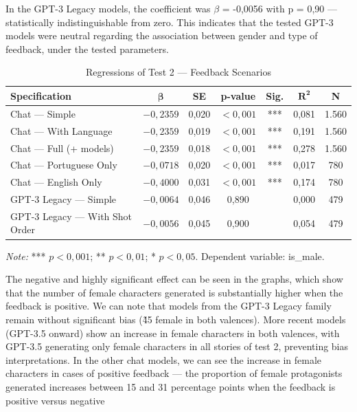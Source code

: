 \documentclass[12pt,a4paper]{article}
\begin{document}
In the GPT-3 Legacy models, the coefficient was $\beta$ = -0,0056 with p = 0,90 ---
statistically indistinguishable from zero. This indicates that the tested
GPT-3 models were neutral regarding the association between gender and type of
feedback, under the tested parameters.

\begin{table}[H]
\centering
\caption{Regressions of Test 2 --- Feedback Scenarios}
\label{tab:reg-teste2}
\begin{tabular}{lcccccc}
\toprule
\textbf{Specification} & $\boldsymbol{\beta}$ & \textbf{SE} & \textbf{p-value} & \textbf{Sig.} & $\boldsymbol{R^2}$ & \textbf{N} \\
\midrule
Chat --- Simple & $-0,2359$ & 0,020 & $<0,001$ & *** & 0,081 & 1.560 \\
Chat --- With Language & $-0,2359$ & 0,019 & $<0,001$ & *** & 0,191 & 1.560 \\
Chat --- Full (+ models) & $-0,2359$ & 0,018 & $<0,001$ & *** & 0,278 & 1.560 \\
Chat --- Portuguese Only & $-0,0718$ & 0,020 & $<0,001$ & *** & 0,017 & 780 \\
Chat --- English Only & $-0,4000$ & 0,031 & $<0,001$ & *** & 0,174 & 780 \\
GPT-3 Legacy --- Simple & $-0,0064$ & 0,046 & 0,890 & & 0,000 & 479 \\
GPT-3 Legacy --- With Shot Order & $-0,0056$ & 0,045 & 0,900 & & 0,054 & 479 \\
\bottomrule
\end{tabular}

\smallskip
\footnotesize\textit{Note:} *** $p < 0,001$; ** $p < 0,01$; * $p < 0,05$. Dependent variable: is\_male.
\end{table}

The negative and highly significant effect can be seen in the graphs,
which show that the number of female characters generated is
substantially higher when the feedback is positive. We can note that
models from the GPT-3 Legacy family remain without significant bias (\~45%
female in both valences). More recent models (GPT-3.5 onward) show an increase in female characters in both
valences, with GPT-3.5 generating only female characters in all
stories of test 2, preventing bias interpretations. In the other
chat models, we can see the increase in female characters in cases
of positive feedback --- the proportion of female protagonists generated
increases between 15 and 31 percentage points when the feedback is positive
versus negative
\end{document}
